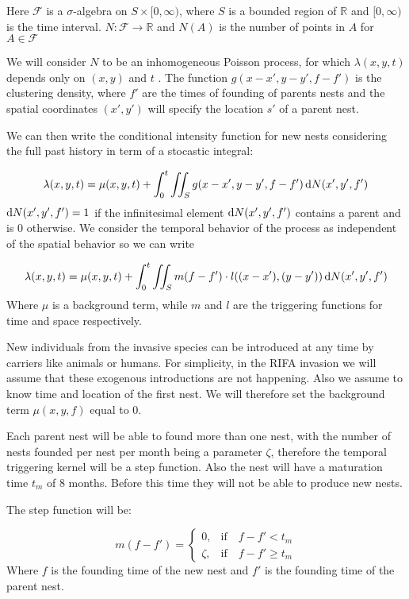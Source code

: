 Here $\mathcal{F}$ is a $\sigma$-algebra on $S \times [0, \infty )$, where $S$ is a bounded region of $\mathbb{R}$ and $[0, \infty)$ is the time interval. $N: \mathcal{F} \to \mathbb{R}$ and $N(A)$ is the number of points in $A$ for $A \in \mathcal{F}$

We will consider $N$ to be an inhomogeneous Poisson process, for which $\lambda(x, y, t)$ depends only on $(x, y)$ and $t$ \cite{Schoenberg}. The function $g(x - x', y - y', f - f')$ is the clustering density, where $f'$ are the times of founding of parents nests and the spatial coordinates $(x', y')$ will specify the location $s'$ of a parent nest.


We can then write the conditional intensity function for new nests considering the full past history in term of a stocastic integral:

\[
\lambda(x, y, t) = \mu(x, y, t) + \int_{0}^{t} \iint_{S} g(x - x', y - y', f - f') \operatorname{d}\!{N}(x', y', f')
\]
$\operatorname{d}\!{N}(x', y', f') = 1$ if the infinitesimal element $\operatorname{d}\!{N}(x', y', f')$ contains a parent and is 0 otherwise. We consider the temporal behavior of the process as independent of the spatial behavior so we can write

\[
\lambda(x, y, t) = \mu(x, y, t) + \int_{0}^{t} \iint_{S} m(f-f') \cdot l((x - x'), (y - y')) \operatorname{d}\!{N}(x', y', f')
\]
Where $\mu$ is a background term, while $m$ and $l$ are the triggering functions for time and space respectively. 

New individuals from the invasive species can be introduced at any time by carriers like animals or humans. For simplicity, in the RIFA invasion we will assume that these exogenous introductions are not happening. Also we assume to know time and location of the first nest.  We will therefore set the background term $\mu(x, y, f) $ equal to 0.

Each parent nest will be able to found more than one nest, with the number of nests founded per nest per month being a parameter $\zeta$, therefore the temporal triggering kernel will be a step function. Also the nest will have a maturation time $t_m$ of 8 months. Before this time they will not be able to produce new nests. 

The step function will be:


\[
m (f - f') =
\begin{cases}
0, & \mbox{if} \quad f - f' < t_{m} \\
\zeta, & \mbox{if} \quad f - f' \geq t_{m}
\end{cases}
\]
Where $f$ is the founding time of the new nest and $f'$ is the founding time of the parent nest.

